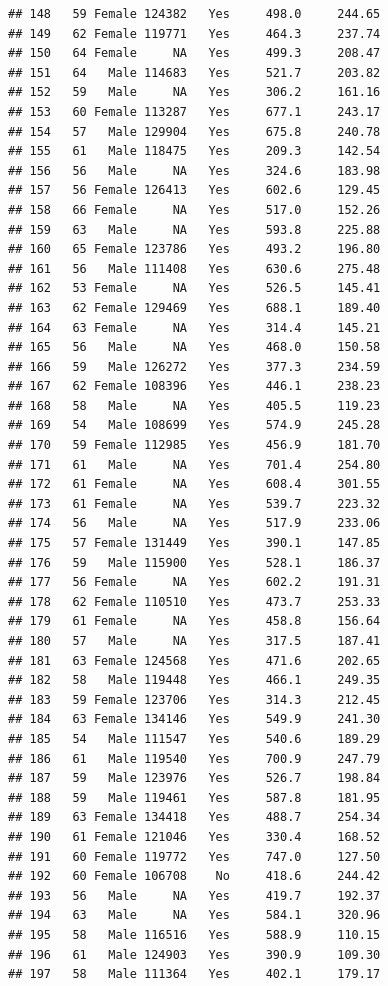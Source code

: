 \documentclass[12pt,]{krantz}
\theoremstyle{definition}
\theoremstyle{definition}
\theoremstyle{remark}
\begin{document}
\begin{verbatim}
## 148   59 Female 124382   Yes     498.0     244.65
## 149   62 Female 119771   Yes     464.3     237.74
## 150   64 Female     NA   Yes     499.3     208.47
## 151   64   Male 114683   Yes     521.7     203.82
## 152   59   Male     NA   Yes     306.2     161.16
## 153   60 Female 113287   Yes     677.1     243.17
## 154   57   Male 129904   Yes     675.8     240.78
## 155   61   Male 118475   Yes     209.3     142.54
## 156   56   Male     NA   Yes     324.6     183.98
## 157   56 Female 126413   Yes     602.6     129.45
## 158   66 Female     NA   Yes     517.0     152.26
## 159   63   Male     NA   Yes     593.8     225.88
## 160   65 Female 123786   Yes     493.2     196.80
## 161   56   Male 111408   Yes     630.6     275.48
## 162   53 Female     NA   Yes     526.5     145.41
## 163   62 Female 129469   Yes     688.1     189.40
## 164   63 Female     NA   Yes     314.4     145.21
## 165   56   Male     NA   Yes     468.0     150.58
## 166   59   Male 126272   Yes     377.3     234.59
## 167   62 Female 108396   Yes     446.1     238.23
## 168   58   Male     NA   Yes     405.5     119.23
## 169   54   Male 108699   Yes     574.9     245.28
## 170   59 Female 112985   Yes     456.9     181.70
## 171   61   Male     NA   Yes     701.4     254.80
## 172   61 Female     NA   Yes     608.4     301.55
## 173   61 Female     NA   Yes     539.7     223.32
## 174   56   Male     NA   Yes     517.9     233.06
## 175   57 Female 131449   Yes     390.1     147.85
## 176   59   Male 115900   Yes     528.1     186.37
## 177   56 Female     NA   Yes     602.2     191.31
## 178   62 Female 110510   Yes     473.7     253.33
## 179   61 Female     NA   Yes     458.8     156.64
## 180   57   Male     NA   Yes     317.5     187.41
## 181   63 Female 124568   Yes     471.6     202.65
## 182   58   Male 119448   Yes     466.1     249.35
## 183   59 Female 123706   Yes     314.3     212.45
## 184   63 Female 134146   Yes     549.9     241.30
## 185   54   Male 111547   Yes     540.6     189.29
## 186   61   Male 119540   Yes     700.9     247.79
## 187   59   Male 123976   Yes     526.7     198.84
## 188   59   Male 119461   Yes     587.8     181.95
## 189   63 Female 134418   Yes     488.7     254.34
## 190   61 Female 121046   Yes     330.4     168.52
## 191   60 Female 119772   Yes     747.0     127.50
## 192   60 Female 106708    No     418.6     244.42
## 193   56   Male     NA   Yes     419.7     192.37
## 194   63   Male     NA   Yes     584.1     320.96
## 195   58   Male 116516   Yes     588.9     110.15
## 196   61   Male 124903   Yes     390.9     109.30
## 197   58   Male 111364   Yes     402.1     179.17

\end{verbatim}
\end{document}
